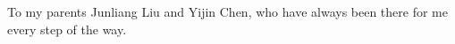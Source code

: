 
To my parents Junliang Liu and Yijin Chen, who have always been there for me every step of the way.